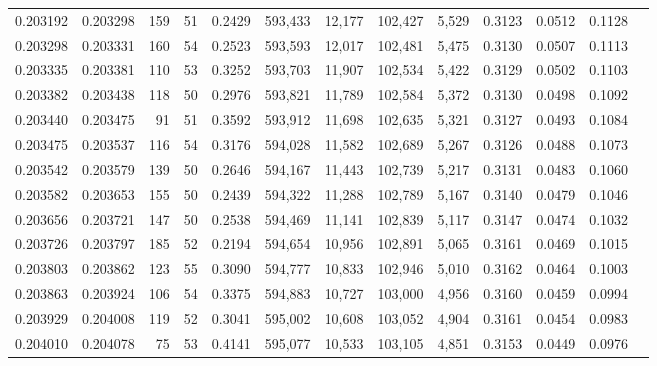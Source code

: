 \begin{tabular}{rrrrrrrrrrrrr}
0.203192 & 0.203298 &   159 &  51 &                                     0.2429 & 593,433 &  12,177 & 102,427 &   5,529 & 0.3123 & 0.0512 & 0.1128 \\
0.203298 & 0.203331 &   160 &  54 &                                     0.2523 & 593,593 &  12,017 & 102,481 &   5,475 & 0.3130 & 0.0507 & 0.1113 \\
0.203335 & 0.203381 &   110 &  53 &                                     0.3252 & 593,703 &  11,907 & 102,534 &   5,422 & 0.3129 & 0.0502 & 0.1103 \\
0.203382 & 0.203438 &   118 &  50 &                                     0.2976 & 593,821 &  11,789 & 102,584 &   5,372 & 0.3130 & 0.0498 & 0.1092 \\
0.203440 & 0.203475 &    91 &  51 &                                     0.3592 & 593,912 &  11,698 & 102,635 &   5,321 & 0.3127 & 0.0493 & 0.1084 \\
0.203475 & 0.203537 &   116 &  54 &                                     0.3176 & 594,028 &  11,582 & 102,689 &   5,267 & 0.3126 & 0.0488 & 0.1073 \\
0.203542 & 0.203579 &   139 &  50 &                                     0.2646 & 594,167 &  11,443 & 102,739 &   5,217 & 0.3131 & 0.0483 & 0.1060 \\
0.203582 & 0.203653 &   155 &  50 &                                     0.2439 & 594,322 &  11,288 & 102,789 &   5,167 & 0.3140 & 0.0479 & 0.1046 \\
0.203656 & 0.203721 &   147 &  50 &                                     0.2538 & 594,469 &  11,141 & 102,839 &   5,117 & 0.3147 & 0.0474 & 0.1032 \\
0.203726 & 0.203797 &   185 &  52 &                                     0.2194 & 594,654 &  10,956 & 102,891 &   5,065 & 0.3161 & 0.0469 & 0.1015 \\
0.203803 & 0.203862 &   123 &  55 &                                     0.3090 & 594,777 &  10,833 & 102,946 &   5,010 & 0.3162 & 0.0464 & 0.1003 \\
0.203863 & 0.203924 &   106 &  54 &                                     0.3375 & 594,883 &  10,727 & 103,000 &   4,956 & 0.3160 & 0.0459 & 0.0994 \\
0.203929 & 0.204008 &   119 &  52 &                                     0.3041 & 595,002 &  10,608 & 103,052 &   4,904 & 0.3161 & 0.0454 & 0.0983 \\
0.204010 & 0.204078 &    75 &  53 &                                     0.4141 & 595,077 &  10,533 & 103,105 &   4,851 & 0.3153 & 0.0449 & 0.0976 \\

\end{tabular}
